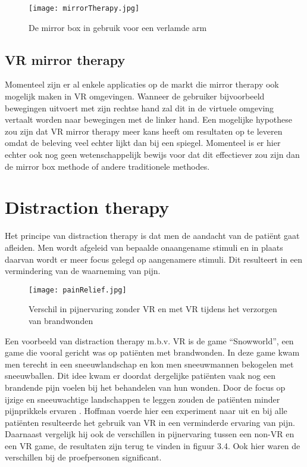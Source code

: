 \begin{figure}[h]
    \centering
    \texttt{[image: mirrorTherapy.jpg]}
    \caption{De mirror box in gebruik voor een verlamde arm \autocite{Saebo2018}}
\end{figure}

\subsection{VR mirror therapy}
Momenteel zijn er al enkele applicaties op de markt die mirror therapy ook mogelijk maken in VR omgevingen. Wanneer de gebruiker bijvoorbeeld bewegingen uitvoert met zijn rechtse hand zal dit in de virtuele omgeving vertaalt worden naar bewegingen met de linker hand. Een mogelijke hypothese zou zijn dat VR mirror therapy meer kans heeft om resultaten op te leveren omdat de beleving veel echter lijkt dan bij een spiegel. Momenteel is er hier echter ook nog geen wetenschappelijk bewijs voor dat dit effectiever zou zijn dan de mirror box methode of andere traditionele methodes. 

\section{Distraction therapy}
Het principe van distraction therapy is dat men de aandacht van de patiënt gaat afleiden. Men wordt afgeleid van bepaalde onaangename stimuli en in plaats daarvan wordt er meer focus gelegd op aangenamere stimuli. Dit resulteert in een vermindering van de waarneming van pijn. 

\begin{figure}[h]
    \centering
    \texttt{[image: painRelief.jpg]}
    \caption{ Verschil in pijnervaring zonder VR en met VR tijdens het verzorgen van brandwonden \autocite{Panjwani2017}}
\end{figure}

Een voorbeeld van distraction therapy m.b.v. VR is de game “Snowworld”, een game die vooral gericht was op patiënten met brandwonden. In deze game kwam men terecht in een sneeuwlandschap en kon men sneeuwmannen bekogelen met sneeuwballen. Dit idee kwam er doordat dergelijke patiënten vaak nog een brandende pijn voelen bij het behandelen van hun wonden. Door de focus op ijzige en sneeuwachtige landschappen te leggen zouden de patiënten minder pijnprikkels ervaren \autocite{Panjwani2017} .
Hoffman voerde hier een experiment naar uit en bij alle patiënten resulteerde het gebruik van VR in een verminderde ervaring van pijn. Daarnaast vergelijk hij ook de verschillen in pijnervaring tussen een non-VR en een VR game, de resultaten zijn terug te vinden in figuur 3.4. Ook hier waren de verschillen bij de proefpersonen significant.


